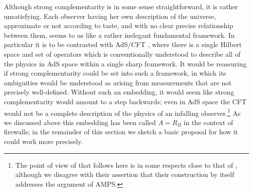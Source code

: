 \documentclass[12pt]{article}
\begin{document}
Although strong complementarity is in some sense straightforward, it is rather unsatisfying.  Each observer having her own description of the universe, approximate or not according to taste, and with no clear precise relationship between them, seems to us like a rather inelegant fundamental framework.  
In particular it is to be contrasted with AdS/CFT \cite{Maldacena:1997re,Witten:1998qj,Gubser:1998bc}, where there is a single Hilbert space and set of operators which is conventionally understood to describe all of the physics in AdS space within a single sharp framework.  It would be reassuring if strong complementarity could be set into such a framework, in which its ambiguities would be understood as arising from measurements that are not precisely well-defined.  Without such an embedding, it would seem like strong complementarity would amount to a step backwards; even in AdS space the CFT would not be a complete description of the physics of an infalling observer.\footnote{The point of view of that follows here is in some respects close to that of \cite{Papadodimas:2012aq}, although we disagree with their assertion that their construction by itself addresses the argument of AMPS.}  As we discussed above this embedding has been called $A=R_B$ in the context of firewalls; in the remainder of this section we sketch a basic proposal for how it could work more precisely.  
\end{document}
